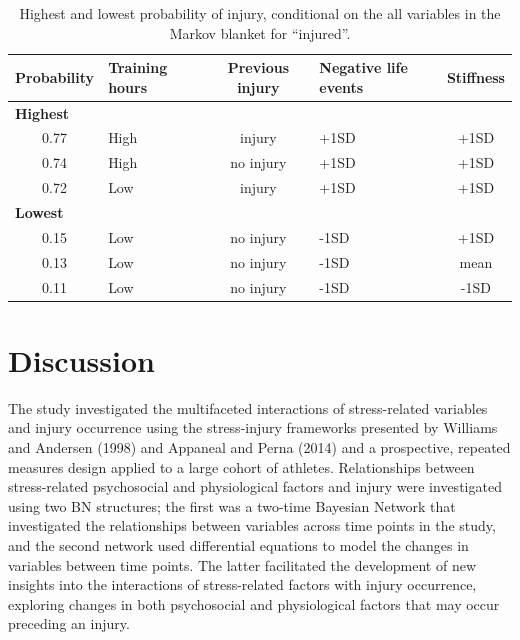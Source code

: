 \documentclass[
  english,
  man]{apa6}
\begin{document}
\begin{table}[H]

\caption{\label{tab:table10}Highest and lowest probability of injury, conditional on the all variables in the Markov blanket for ``injured''.}
\centering
\fontsize{11}{13}\selectfont
\begin{tabular}[t]{c|>{\centering\arraybackslash}p{2.3cm}|c|>{\centering\arraybackslash}p{2.3cm}|c}
\hline
\textbf{Probability} & \textbf{Training hours} & \textbf{Previous injury} & \textbf{Negative life events} & \textbf{Stiffness}\\
\hline
\multicolumn{5}{l}{\textbf{Highest}}\\
\hline
\hspace{1em}0.77 & High & injury & +1SD & +1SD\\
\hline
\hspace{1em}0.74 & High & no injury & +1SD & +1SD\\
\hline
\hspace{1em}0.72 & Low & injury & +1SD & +1SD\\
\hline
\multicolumn{5}{l}{\textbf{Lowest}}\\
\hline
\hspace{1em}0.15 & Low & no injury & -1SD & +1SD\\
\hline
\hspace{1em}0.13 & Low & no injury & -1SD & mean\\
\hline
\hspace{1em}0.11 & Low & no injury & -1SD & -1SD\\
\hline
\end{tabular}
\end{table}

\hypertarget{discussion}{%
\section{Discussion}\label{discussion}}

The study investigated the multifaceted interactions of stress-related variables and injury occurrence using the stress-injury frameworks presented by Williams and Andersen (1998) and Appaneal and Perna (2014) and a prospective, repeated measures design applied to a large cohort of athletes.
Relationships between stress-related psychosocial and physiological factors and injury were investigated using two BN structures; the first was a two-time Bayesian Network that investigated the relationships between variables across time points in the study, and the second network used differential equations to model the changes in variables between time points.
The latter facilitated the development of new insights into the interactions of stress-related factors with injury occurrence, exploring changes in both psychosocial and physiological factors that may occur preceding an injury.
\end{document}

